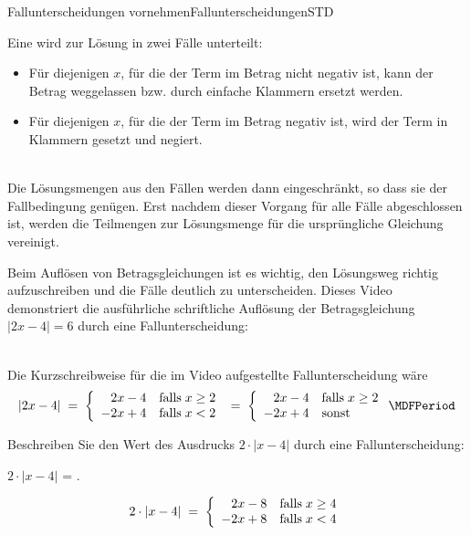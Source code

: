 \begin{MXContent}{Fallunterscheidungen vornehmen}{Fallunterscheidungen}{STD}

\begin{MInfo}
Eine  wird zur Lösung in zwei Fälle unterteilt:
\begin{itemize}
\item{Für diejenigen $x$, für die der Term im Betrag nicht negativ ist, kann der Betrag weggelassen bzw. durch einfache Klammern ersetzt werden.}
\item{Für diejenigen $x$, für die der Term im Betrag negativ ist, wird der Term in Klammern gesetzt und negiert.}
\end{itemize}
\ \\
Die Lösungsmengen aus den Fällen werden dann eingeschränkt, so dass sie der Fallbedingung genügen.
Erst nachdem dieser Vorgang für alle Fälle abgeschlossen ist, werden die Teilmengen zur Lösungsmenge
für die ursprüngliche Gleichung vereinigt.
\end{MInfo}

Beim Auflösen von Betragsgleichungen ist es wichtig, den Lösungsweg richtig aufzuschreiben und die Fälle deutlich zu unterscheiden.
Dieses Video demonstriert die ausführliche schriftliche Auflösung der Betragsgleichung $|2x-4|=6$ durch eine Fallunterscheidung:


\ \\

Die Kurzschreibweise für die im Video aufgestellte Fallunterscheidung wäre
$$
|2x-4| \;=\; \MCases{2x-4 &\text{falls}\;x\geq 2 \\ -2x+4 & \text{falls}\;x<2} \;=\;\MCases{2x-4 &\text{falls}\;x\geq 2 \\ -2x+4 & \text{sonst}} \MDFPeriod
$$

\begin{MExercise}
Beschreiben Sie den Wert des Ausdrucks $2\cdot |x-4|$ durch eine Fallunterscheidung:
\begin{center}
$\displaystyle 2\cdot |x-4|$ = .
\end{center}
\begin{MHint}{\iSolution}
\begin{eqnarray*}
2\cdot |x-4| \;=\; \left\lbrace{\begin{array}{rl} 2x-8 &\text{falls}\;x\geq 4 \\ -2x+8 & \text{falls}\;x<4 \end{array}}\right.
\end{eqnarray*}
\end{MHint}
\end{MExercise}


\end{MXContent}
